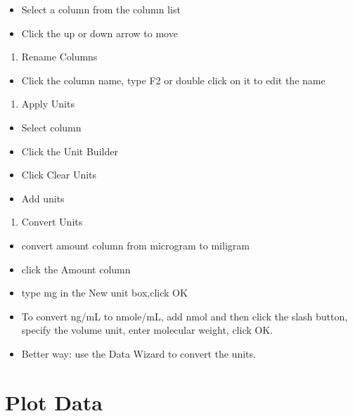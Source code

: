 \documentclass[
  letterpaper,
  DIV=11,
  numbers=noendperiod]{scrreprt}
\providecommand{\tightlist}{%
  \setlength{\itemsep}{0pt}\setlength{\parskip}{0pt}}\usepackage{longtable,booktabs,array}
\begin{document}
\begin{itemize}
\tightlist
\item
  Select a column from the column list
\item
  Click the up or down arrow to move
\end{itemize}

\begin{enumerate}
\def\labelenumi{\arabic{enumi}.}
\setcounter{enumi}{2}
\tightlist
\item
  Rename Columns
\end{enumerate}

\begin{itemize}
\tightlist
\item
  Click the column name, type F2 or double click on it to edit the name
\end{itemize}

\begin{enumerate}
\def\labelenumi{\arabic{enumi}.}
\setcounter{enumi}{3}
\tightlist
\item
  Apply Units
\end{enumerate}

\begin{itemize}
\tightlist
\item
  Select column
\item
  Click the Unit Builder
\item
  Click Clear Units
\item
  Add units
\end{itemize}

\begin{enumerate}
\def\labelenumi{\arabic{enumi}.}
\setcounter{enumi}{4}
\tightlist
\item
  Convert Units
\end{enumerate}

\begin{itemize}
\tightlist
\item
  convert amount column from microgram to miligram
\item
  click the Amount column
\item
  type mg in the New unit box,click OK
\item
  To convert ng/mL to nmole/mL, add nmol and then click the slash
  button, specify the volume unit, enter molecular weight, click OK.
\item
  Better way: use the Data Wizard to convert the units.
\end{itemize}

\hypertarget{plot-data}{%
\section{Plot Data}\label{plot-data}}
\end{document}
